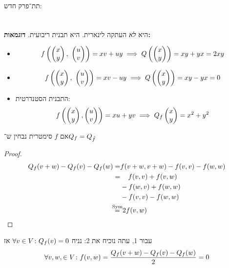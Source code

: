 \documentclass[]{../../../../tex/classes/styledArticle}
\begin{document}
    תת־פרק חדש: 
    \section{}
    היא \textit{לא} העתקה לינארית. היא תבנית ריבועית. \textbf{דוגמאות: }
    \begin{itemize}
        \item 
        \[ f\left ( \begin{pmatrix} x \\ y \end{pmatrix}, \ \begin{pmatrix} u \\ v \end{pmatrix} \right ) = xv + uy \implies Q\left ( \begin{pmatrix} x \\ y \end{pmatrix} \right ) = xy + yx = 2xy \]
        \item 
        \[ f\left ( \begin{pmatrix} x \\ y \end{pmatrix}, \ \begin{pmatrix} u \\ v \end{pmatrix} \right ) = xv - uy \implies Q\left ( \begin{pmatrix} x \\ y \end{pmatrix} \right ) = xy - yx = 0 \]
        \item התבנית הסטנדרטית: 
        \[ f\left ( \begin{pmatrix} x \\ y \end{pmatrix}, \begin{pmatrix} u \\ v \end{pmatrix} \right ) = xu + yv \implies Q_f\begin{pmatrix} x \\ y \end{pmatrix} = x^2 + y^2 \]
    \end{itemize}
    
    אם $f$ סימטרית נבחין ש־$Q_f = Q_{\hat f}$
    
    \begin{proof}
        \begin{align*}
            Q_f(v + w) - Q_f(v) - Q_f(w) = &f(v + w, v + w) - f(v, v) - f(w, w) \\
            = &\quad\, f(v, v) + f(v, w) \\
            &-f(w, v) + f(w, w) \\
            &-f(v, v) - f(w, w) \\
            \overset{\operatorname{Sym}}{=} \!\!&\,\, 2f(v, w)
        \end{align*}
    \end{proof}
    עבור 1, עתה נוכיח את 2: נניח $\forall v \in V \colon Q_f(v) = 0$ אז
    \[ \forall v, w, \in V \colon f(v, w) = \frac{Q_f(v + w) - Q_f(v) - Q_f(w)}{2} = 0  \]
    
\end{document}
